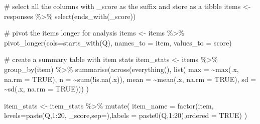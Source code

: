 \documentclass[
  letterpaper,
  DIV=11,
  numbers=noendperiod]{scrreprt}
\newenvironment{Shaded}{\begin{snugshade}}{\end{snugshade}}
\newcommand{\AttributeTok}[1]{\textcolor[rgb]{0.40,0.45,0.13}{#1}}
\newcommand{\CommentTok}[1]{\textcolor[rgb]{0.37,0.37,0.37}{#1}}
\newcommand{\ConstantTok}[1]{\textcolor[rgb]{0.56,0.35,0.01}{#1}}
\newcommand{\DecValTok}[1]{\textcolor[rgb]{0.68,0.00,0.00}{#1}}
\newcommand{\FunctionTok}[1]{\textcolor[rgb]{0.28,0.35,0.67}{#1}}
\newcommand{\NormalTok}[1]{\textcolor[rgb]{0.00,0.23,0.31}{#1}}
\newcommand{\OtherTok}[1]{\textcolor[rgb]{0.00,0.23,0.31}{#1}}
\newcommand{\SpecialCharTok}[1]{\textcolor[rgb]{0.37,0.37,0.37}{#1}}
\newcommand{\StringTok}[1]{\textcolor[rgb]{0.13,0.47,0.30}{#1}}
\begin{document}
\begin{Shaded}
\begin{Highlighting}[]
\CommentTok{\# select all the columns with \_score as the suffix and store as a tibble}
\NormalTok{items }\OtherTok{\textless{}{-}}\NormalTok{ responses }\SpecialCharTok{\%\textgreater{}\%} \FunctionTok{select}\NormalTok{(}\FunctionTok{ends\_with}\NormalTok{(}\StringTok{\textquotesingle{}\_score\textquotesingle{}}\NormalTok{))}

\CommentTok{\# pivot the items longer for analysis}
\NormalTok{items }\OtherTok{\textless{}{-}}\NormalTok{ items }\SpecialCharTok{\%\textgreater{}\%} \FunctionTok{pivot\_longer}\NormalTok{(}\AttributeTok{cols=}\FunctionTok{starts\_with}\NormalTok{(}\StringTok{\textquotesingle{}Q\textquotesingle{}}\NormalTok{), }\AttributeTok{names\_to =} \StringTok{\textquotesingle{}item\textquotesingle{}}\NormalTok{, }\AttributeTok{values\_to =} \StringTok{\textquotesingle{}score\textquotesingle{}}\NormalTok{)}

\CommentTok{\# create a summary table with item stats}
\NormalTok{item\_stats }\OtherTok{\textless{}{-}}\NormalTok{ items }\SpecialCharTok{\%\textgreater{}\%} 
  \FunctionTok{group\_by}\NormalTok{(item) }\SpecialCharTok{\%\textgreater{}\%}
  \FunctionTok{summarise}\NormalTok{(}\FunctionTok{across}\NormalTok{(}\FunctionTok{everything}\NormalTok{(), }
  \FunctionTok{list}\NormalTok{(}
    \AttributeTok{max =} \SpecialCharTok{\textasciitilde{}}\FunctionTok{max}\NormalTok{(.x, }\AttributeTok{na.rm =} \ConstantTok{TRUE}\NormalTok{),}
    \AttributeTok{n =} \SpecialCharTok{\textasciitilde{}}\FunctionTok{sum}\NormalTok{(}\SpecialCharTok{!}\FunctionTok{is.na}\NormalTok{(.x)),}
    \AttributeTok{mean =} \SpecialCharTok{\textasciitilde{}}\FunctionTok{mean}\NormalTok{(.x, }\AttributeTok{na.rm =} \ConstantTok{TRUE}\NormalTok{),}
    \AttributeTok{sd =} \SpecialCharTok{\textasciitilde{}}\FunctionTok{sd}\NormalTok{(.x, }\AttributeTok{na.rm =} \ConstantTok{TRUE}\NormalTok{)))}
\NormalTok{)}

\NormalTok{item\_stats }\OtherTok{\textless{}{-}}\NormalTok{ item\_stats }\SpecialCharTok{\%\textgreater{}\%} \FunctionTok{mutate}\NormalTok{(}
    \AttributeTok{item\_name =} \FunctionTok{factor}\NormalTok{(item, }\AttributeTok{levels=}\FunctionTok{paste}\NormalTok{(}\StringTok{\textquotesingle{}Q\textquotesingle{}}\NormalTok{,}\DecValTok{1}\SpecialCharTok{:}\DecValTok{20}\NormalTok{, }\StringTok{\textquotesingle{}\_score\textquotesingle{}}\NormalTok{,}\AttributeTok{sep=}\StringTok{\textquotesingle{}\textquotesingle{}}\NormalTok{),}\AttributeTok{labels =} \FunctionTok{paste0}\NormalTok{(}\StringTok{\textquotesingle{}Q\textquotesingle{}}\NormalTok{,}\DecValTok{1}\SpecialCharTok{:}\DecValTok{20}\NormalTok{),}\AttributeTok{ordered =} \ConstantTok{TRUE}\NormalTok{)}
\NormalTok{)}


\end{Highlighting}
\end{Shaded}
\end{document}
